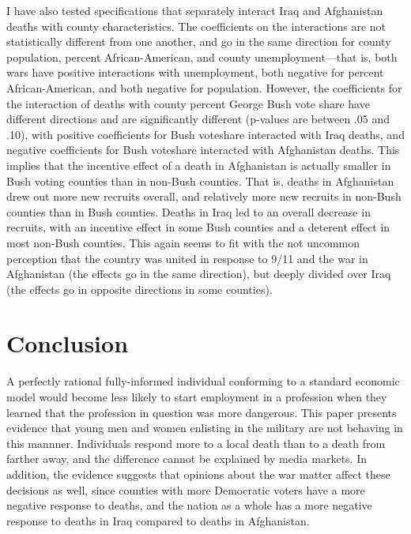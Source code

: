 \documentclass[12pt] {article}
\begin{document}
I have also tested specifications that separately interact Iraq and Afghanistan deaths with county characteristics. The coefficients on the interactions are not statistically different from one another, and go in the same direction for county population, percent African-American, and county unemployment---that is, both wars have positive interactions with unemployment, both negative for percent African-American, and both negative for population. However, the coefficients for the interaction of deaths with county percent George Bush vote share have different directions and are significantly different (p-values are between .05 and .10), with positive coefficients for Bush voteshare interacted with Iraq deaths, and negative coefficients for Bush voteshare interacted with Afghanistan deaths. This implies that the incentive effect of a death in Afghanistan is actually smaller in Bush voting counties than in non-Bush counties. That is, deaths in Afghanistan drew out more new recruits overall, and relatively more new recruits in non-Bush counties than in Bush counties. Deaths in Iraq led to an overall decrease in recruits, with an incentive effect in some Bush counties and a deterent effect in most non-Bush counties. This again seems to fit with the not uncommon perception that the country was united in response to 9/11 and the war in Afghanistan (the effects go in the same direction), but deeply divided over Iraq (the effects go in opposite directions in some counties). 

\section{Conclusion}\label{sec:Conclusion}


A perfectly rational fully-informed individual conforming to a standard economic model would become less likely to start employment in a profession when they learned that the profession in question was more dangerous. This paper presents evidence that young men and women enlisting in the military are not behaving in this mannner. Individuals respond more to a local death than to a death from farther away, and the difference cannot be explained by media markets. In addition, the evidence suggests that opinions about the war matter affect these decisions as well, since counties with more Democratic voters have a more negative response to deaths, and the nation as a whole has a more negative response to deaths in Iraq compared to deaths in Afghanistan. 
\end{document}

